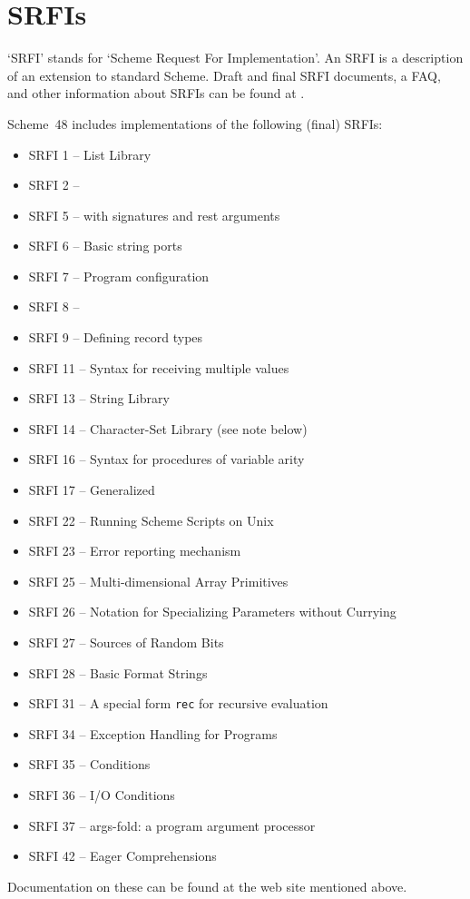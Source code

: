 \section{SRFIs}

`SRFI' stands for `Scheme Request For Implementation'.
An SRFI is a description of an extension to standard Scheme.
Draft and final SRFI documents, a FAQ, and other information about SRFIs
 can be found at
.

Scheme~48 includes implementations of the following (final) SRFIs:
\begin{itemize}
\item SRFI 1 -- List Library
\item SRFI 2 -- 
\item SRFI 5 --  with signatures and rest arguments
\item SRFI 6 -- Basic string ports
\item SRFI 7 -- Program configuration
\item SRFI 8 -- 
\item SRFI 9 -- Defining record types
\item SRFI 11 -- Syntax for receiving multiple values 
\item SRFI 13 -- String Library
\item SRFI 14 -- Character-Set Library (see note below)
\item SRFI 16 -- Syntax for procedures of variable arity
\item SRFI 17 -- Generalized 
\item SRFI 22 -- Running Scheme Scripts on Unix
\item SRFI 23 -- Error reporting mechanism
\item SRFI 25 -- Multi-dimensional Array Primitives 
\item SRFI 26 -- Notation for Specializing Parameters without Currying
\item SRFI 27 -- Sources of Random Bits
\item SRFI 28 -- Basic Format Strings
\item SRFI 31 -- A special form \texttt{rec} for recursive evaluation
\item SRFI 34 -- Exception Handling for Programs
\item SRFI 35 -- Conditions
\item SRFI 36 -- I/O Conditions
\item SRFI 37 -- args-fold: a program argument processor
\item SRFI 42 -- Eager Comprehensions
\end{itemize}
Documentation on these can be found at the web site mentioned above.

